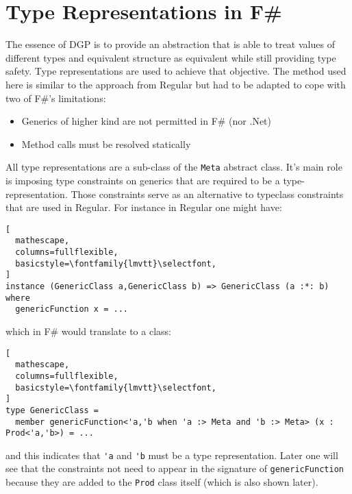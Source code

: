\documentclass{sigplanconf}
\begin{document}
\section{Type Representations in F\#}
The essence of DGP is to provide an abstraction that is able to treat values of different types and equivalent structure as equivalent while still providing type safety. Type representations are used to achieve that objective. The method used here is similar to the approach from Regular\cite{Regular} but had to be adapted to cope with two of F\#'s limitations:
\begin{itemize}
\item Generics of higher kind are not permitted in F\# (nor .Net)
\item Method calls must be resolved statically
\end{itemize}
All type representations are a sub-class of the \verb+Meta+ abstract class. It's main role is imposing type constraints on generics that are required to be a type-representation. Those constraints serve as an alternative to typeclass constraints that are used in Regular. For instance in Regular one might have:
\begin{lstlisting}[
  mathescape,
  columns=fullflexible,
  basicstyle=\fontfamily{lmvtt}\selectfont,
]
instance (GenericClass a,GenericClass b) => GenericClass (a :*: b) where
  genericFunction x = ...
\end{lstlisting}
which in F\# would translate to a class:
\begin{lstlisting}[
  mathescape,
  columns=fullflexible,
  basicstyle=\fontfamily{lmvtt}\selectfont,
]
type GenericClass =
  member genericFunction<'a,'b when 'a :> Meta and 'b :> Meta> (x : Prod<'a,'b>) = ...
\end{lstlisting}
and this indicates that \verb+'a+ and \verb+'b+ must be a type representation. Later one will see that the constraints not need to appear in the signature of \verb+genericFunction+ because they are added to the \verb+Prod+ class itself (which is also shown later).
\end{document}
